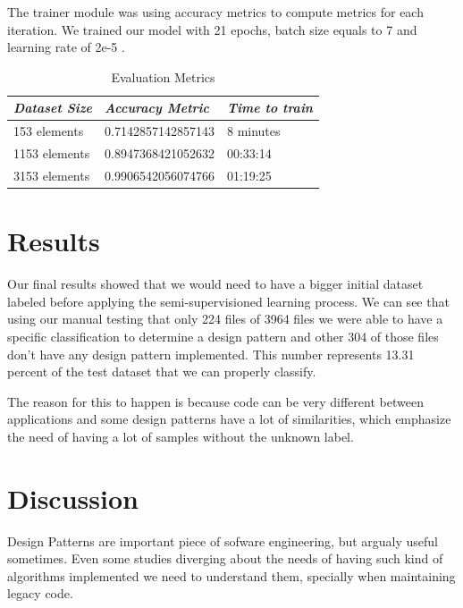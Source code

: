 \documentclass[conference]{IEEEtran}
\begin{document}
The trainer module was using accuracy metrics to compute metrics for each iteration. We trained our model with 21 epochs, batch size equals to 7 and learning rate of 2e-5 .
\begin{table}[htbp]
    \caption{Evaluation Metrics}
    \begin{center}
        \begin{tabular}{|m{2cm}|m{3cm}|m{2cm}|}
            \hline
            \textbf\textbf{\textit{Dataset Size}}& \textbf{\textit{Accuracy Metric}}&  \textbf{\textit{Time to train}}\\
            \hline 
            153 elements & 0.7142857142857143 & 8 minutes  \\
            \hline 
            1153 elements & 0.8947368421052632 & 00:33:14 \\
            \hline 
            3153 elements & 0.9906542056074766 & 01:19:25 \\
            \hline
        \end{tabular}
        \label{tab3}
    \end{center}
\end{table}

\section{Results}

Our final results showed that we would need to have a bigger initial dataset labeled before applying the semi-supervisioned learning process.
We can see that using our manual testing that only 224 files of 3964 files we were able to have a specific classification to determine a design pattern and other 304 of those files don't have any design pattern implemented.
This number represents 13.31 percent of the test dataset that we can properly classify. 

The reason for this to happen is because code can be very different between applications and some design patterns have a lot of similarities, which emphasize the need of having a lot of samples without the unknown label.

\section{Discussion}

Design Patterns are important piece of sofware engineering, but argualy useful sometimes. Even some studies diverging about the needs of having such kind of algorithms implemented we need to understand them, specially when maintaining legacy code.
\end{document}
